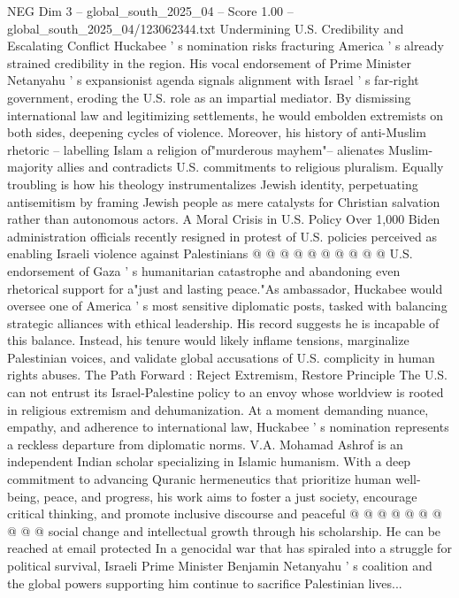 \begin{textsample}{NEG Dim 3 – global\_south\_2025\_04 – Score 1.00 – global\_south\_2025\_04/123062344.txt}
Undermining U.S.
Credibility and Escalating Conflict Huckabee ' s nomination risks fracturing America ' s already strained credibility in the region.
His vocal endorsement of Prime Minister Netanyahu ' s expansionist agenda signals alignment with Israel ' s far-right government, eroding the U.S. role as an impartial mediator.
By dismissing international law and legitimizing settlements, he would embolden extremists on both sides, deepening cycles of violence.
Moreover, his history of anti-Muslim rhetoric -- labelling Islam a religion of"murderous mayhem"-- alienates Muslim-majority allies and contradicts U.S. commitments to religious pluralism.
Equally troubling is how his theology instrumentalizes Jewish identity, perpetuating antisemitism by framing Jewish people as mere catalysts for Christian salvation rather than autonomous actors.
A Moral Crisis in U.S.
Policy Over 1,000 Biden administration officials recently resigned in protest of U.S. policies perceived as enabling Israeli violence against Palestinians @ @ @ @ @ @ @ @ @ @ U.S. endorsement of Gaza ' s humanitarian catastrophe and abandoning even rhetorical support for a"just and lasting peace."As ambassador, Huckabee would oversee one of America ' s most sensitive diplomatic posts, tasked with balancing strategic alliances with ethical leadership.
His record suggests he is incapable of this balance.
Instead, his tenure would likely inflame tensions, marginalize Palestinian voices, and validate global accusations of U.S. complicity in human rights abuses.
The Path Forward : Reject Extremism, Restore Principle The U.S. can not entrust its Israel-Palestine policy to an envoy whose worldview is rooted in religious extremism and dehumanization.
At a moment demanding nuance, empathy, and adherence to international law, Huckabee ' s nomination represents a reckless departure from diplomatic norms.
V.A.
Mohamad Ashrof is an independent Indian scholar specializing in Islamic humanism.
With a deep commitment to advancing Quranic hermeneutics that prioritize human well-being, peace, and progress, his work aims to foster a just society, encourage critical thinking, and promote inclusive discourse and peaceful @ @ @ @ @ @ @ @ @ @ social change and intellectual growth through his scholarship.
He can be reached at email protected In a genocidal war that has spiraled into a struggle for political survival, Israeli Prime Minister Benjamin Netanyahu ' s coalition and the global powers supporting him continue to sacrifice Palestinian lives...

\end{textsample}
